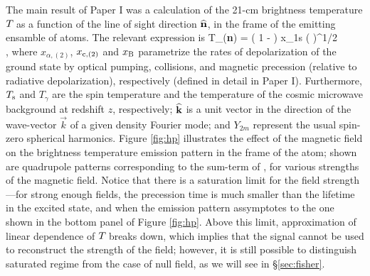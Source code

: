 The main result of Paper I was a calculation of the 21-cm brightness temperature $T_{\rm }$ as a function of the line of sight direction ${\bf{\widehat n}}$, in the frame of the emitting ensamble of atoms. The relevant expression is
\beq
\bga
   T_{\rm }({\bf{\widehat n}}) = \left( 1 -  \right) x_{1{\rm s}} \left(  \right)^{1/2} \\
  \times {} \mbox{,} 
\ega
\label{eq:tbsoln}
\eeq
where $x_{\alpha, (2)}$, $x_{{\rm c}, (2)}$ and $x_{\rm B}$ parametrize the rates of depolarization of the ground state by optical pumping, collisions, and magnetic precession (relative to radiative depolarization), respectively (defined in detail in Paper I). Furthermore,  $T_{\rm s}$ and $T_\gamma$ are the spin temperature and the temperature of the cosmic microwave background at redshift $z$, respectively; $\bf{\widehat k}$ is a unit vector in the direction of the wave-vector $\vec k$ of a given density Fourier mode; and $Y_{2 m}$ represent the usual spin-zero spherical harmonics. Figure \ref{fig:hp} illustrates the effect of the magnetic field on the brightness temperature emission pattern in the frame of the atom; shown are quadrupole patterns corresponding to the sum-term of \eq{\ref{eq:tbsoln}}, for various strengths of the magnetic field. Notice that there is a saturation limit for the field strength---for strong enough fields, the precession time is much smaller than the lifetime in the excited state, and when the emission pattern assymptotes to the one shown in the bottom panel of Figure \ref{fig:hp}. Above this limit, approximation of linear dependence of $T_{\rm }$ breaks down, which implies that the signal cannot be used to reconstruct the strength of the field; however, it is still possible to distinguish saturated regime from the case of null field, as we will see in \S\ref{sec:fisher}.
